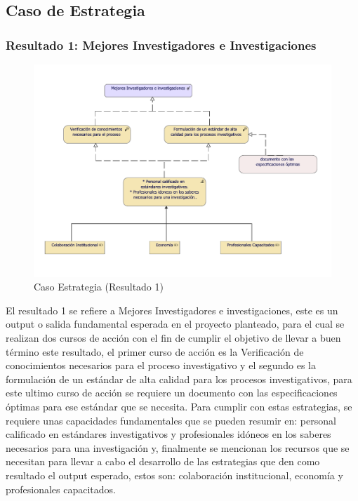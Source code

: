 \subsection{Caso de Estrategia}

\subsubsection{Resultado 1: Mejores Investigadores e Investigaciones}

\begin{figure}[h!]
	\centering
	\includegraphics[width=1\linewidth]{imgs/modelo/estrategia/Estrate/EstrategiaResult1.pdf}
	\caption{Caso Estrategia (Resultado 1)}
\end{figure}

El resultado 1 se refiere a Mejores Investigadores e investigaciones, este es un output o salida fundamental esperada en el proyecto planteado, para el cual se realizan dos cursos de acción con el fin de cumplir el objetivo de llevar a buen término este resultado, el primer curso de acción es la Verificación de conocimientos necesarios para el proceso investigativo y el segundo es la formulación de un estándar de alta calidad para los procesos investigativos,  para este ultimo curso de acción se requiere un documento con las especificaciones óptimas para ese estándar que se necesita. Para cumplir con estas estrategias, se requiere unas capacidades fundamentales que se pueden resumir en: personal calificado en estándares investigativos y profesionales idóneos en los saberes necesarios para una investigación y, finalmente se mencionan los recursos que se necesitan para llevar a cabo el desarrollo de las estrategias que den como resultado el output esperado, estos son: colaboración institucional, economía y profesionales capacitados.


